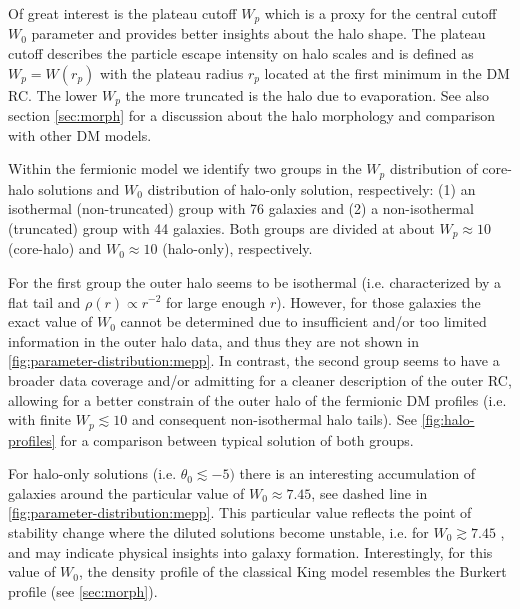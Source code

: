Of great interest is the plateau cutoff $W_p$ which is a proxy for the central cutoff $W_0$ parameter and provides better insights about the halo shape. The plateau cutoff describes the particle escape intensity on halo scales and is defined as $W_p = W(r_p)$ with the plateau radius $r_p$ located at the first minimum in the DM RC. The lower $W_p$ the more truncated is the halo due to evaporation. See also section \ref{sec:morph} for a discussion about the halo morphology and comparison with other DM models.

Within the fermionic model we identify two groups in the $W_p$ distribution of core-halo solutions and $W_0$ distribution of halo-only solution, respectively: (1) an isothermal (non-truncated) group with 76 galaxies and (2) a non-isothermal (truncated) group with 44 galaxies. Both groups are divided at about $W_p \approx 10$ (core-halo) and $W_0 \approx 10$ (halo-only), respectively.

For the first group the outer halo seems to be isothermal (i.e. characterized by a flat tail and $\rho(r) \propto r^{-2}$ for large enough $r$). However, for those galaxies the exact value of $W_0$ cannot be determined due to insufficient and/or too limited information in the outer halo data, and thus they are not shown in \cref{fig:parameter-distribution:mepp}. In contrast, the second group seems to have a broader data coverage and/or admitting for a cleaner description of the outer RC, allowing for a better constrain of the outer halo of the fermionic DM profiles (i.e. with finite $W_p \lesssim 10$ and consequent non-isothermal halo tails). See \cref{fig:halo-profiles} for a comparison between typical solution of both groups.

For halo-only solutions (i.e. $\theta_0 \lesssim -5)$ there is an interesting accumulation of galaxies around the particular value of $W_0 \approx 7.45$, see dashed line in \cref{fig:parameter-distribution:mepp}. This particular value reflects the point of stability change where the diluted solutions become unstable, i.e. for $W_0 \gtrsim 7.45$ \citep{2015PhRvD..91f3531C}, and may indicate physical insights into galaxy formation. Interestingly, for this value of $W_0$, the density profile of the classical King model resembles the Burkert profile (see \ref{sec:morph}). %

